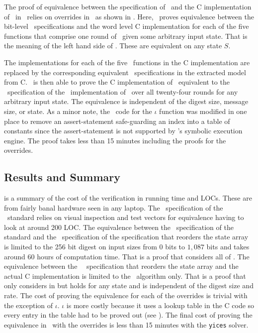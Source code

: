 The proof of equivalence between the specification of \keccak\ and the C implementation of \keccak\ in \openssl\ relies on overrides in \saw\ as shown in .
Here, \saw\ proves equivalence between the bit-level \cryptol\ specifications and the word level C implementation for each of the five functions that comprise one round of \keccak\ given some arbitrary input state.
That is the meaning of the left hand side of .
These are equivalent on any state $S$.

The implementations for each of the five \keccak\ functions in the C implementation are replaced by the corresponding equivalent \cryptol\ specifications in the extracted model from C.
\saw\ is then able to prove the C implementation of \keccak\ equivalent to the \cryptol\ specification of the \openssl\ implementation of \keccak\ over all twenty-four rounds for any arbitrary input state.
The equivalence is independent of the digest size, message size, or state.
As a minor note, the \openssl\ code for the $\iota$ function was modified in one place to remove an assert-statement safe-guarding an index into a table of constants since the assert-statement is not supported by \saw's symbolic execution engine. The proof takes less than 15 minutes including the proofs for the overrides.


\subsection{Results and Summary}

 is a summary of the cost of the verification in running time and LOCs. These are from fairly banal hardware seen in any laptop.
The \cryptol\ specification of the \fips\ standard relies on visual inspection and test vectors for equivalence having to look at around 200 LOC.
The equivalence between the \cryptol\ specification of the standard and the \cryptol\ specification of the \openssl specification that reorders the state array is limited to the 256 bit digest on input sizes from $0$ bits to $1,087$ bits and takes around 60 hours of computation time.
That is a proof that considers all of .
The equivalence between the \openssl\ \cryptol\ specification that reorders the state array and the actual C implementation is limited to the \keccak\ algorithm only.
That is a proof that only considers  in  but holds for any state and is independent of the digest size and rate.
The cost of proving the equivalence for each of the overrides is trivial with the exception of $\iota$.
$\iota$ is more costly because it uses a lookup table in the C code so every entry in the table had to be proved out (see ).
The final cost of proving the equivalence in \keccak\ with the overrides is less than 15 minutes with the \texttt{yices} solver.


